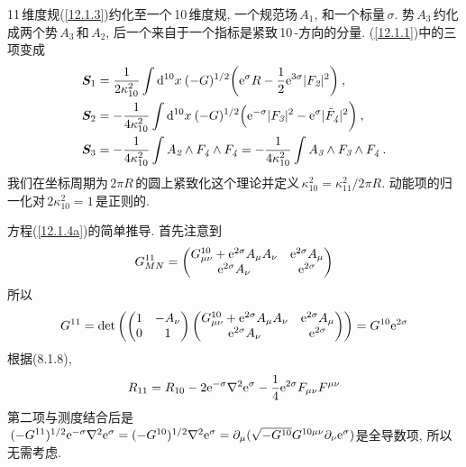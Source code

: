 11\,维度规(\ref{12.1.3})约化至一个\,10\,维度规, 一个规范场$\,A_{\textit{1}}$, 和一个标量$\,\sigma$. 势$\,A_{\textit{3}}\,$约化成两个势$\,A_{\textit{3}}\,$和$\,A_{\textit{2}}$, 后一个来自于一个指标是紧致\,10\,-方向的分量. (\ref{12.1.1})中的三项变成
\begin{subequations}
    \begin{align}
        \bm{S}_{1} &=\frac{1}{2\kappa_{10}^{2}}\int \mathrm{d}^{10}x\:(-G)^{1/2}\biggl(\mathrm{e}^{\sigma}R-\frac{1}{2}\mathrm{e}^{3\sigma}\lvert F_{\textit{2}}\rvert^{2}\biggr) \:, \label{12.1.4a} \\
        \bm{S}_{2} &=-\frac{1}{4\kappa_{10}^{2}}\int \mathrm{d}^{10}x\:(-G)^{1/2}\Bigl(\mathrm{e}^{-\sigma}\lvert F_{\textit{3}}\rvert^{2}-\mathrm{e}^{\sigma}\lvert \tilde{F}_{\textit{4}}\rvert^{2}\biggr) \:, \label{12.1.4b} \\
         \bm{S}_{3} &= - \frac{1}{4\kappa_{10}^{2}}\int A_{\textit{2}}\wedge  F_{\textit{4}} \wedge F_{\textit{4}}
         = - \frac{1}{4\kappa_{10}^{2}}\int A_{\textit{3}}\wedge  F_{\textit{3}} \wedge F_{\textit{4}} \:. \label{12.1.4c}
     \end{align}  \label{12.1.4}
\end{subequations}
我们在坐标周期为$\,2\pi R\,$的圆上紧致化这个理论并定义$\,\kappa_{10}^{2}=\kappa_{11}^{2}/2\pi R$. 动能项的归一化对$\,2\kappa_{10}^{2}=1\,$是正则的.

\begin{tcolorbox}
方程(\ref{12.1.4a})的简单推导. 首先注意到
\[
 G_{MN}^{11}=\begin{pmatrix}
     G_{\mu\nu}^{10}+\mathrm{e}^{2\sigma} A_{\mu}A_{\nu} & \mathrm{e}^{2\sigma}A_{\mu} \\
     \mathrm{e}^{2\sigma} A_{\nu} &\mathrm{e}^{2\sigma}
 \end{pmatrix}    
 \]
 所以
 \[
    G^{11}=\operatorname{det} \left(\begin{pmatrix}
        1 & -A_{\nu} \\
        0 & 1
    \end{pmatrix}    \begin{pmatrix}
        G_{\mu\nu}^{10}+\mathrm{e}^{2\sigma} A_{\mu}A_{\nu} & \mathrm{e}^{2\sigma}A_{\mu} \\
        \mathrm{e}^{2\sigma} A_{\nu} &\mathrm{e}^{2\sigma}
    \end{pmatrix}    \right)   = G^{10} \mathrm{e}^{2\sigma}
\]
根据(\textcolor{foo}{8.1.8}),
\[
            R_{11}=R_{10}-2\mathrm{e}^{-\sigma} \nabla^{2} \mathrm{e}^{\sigma} -\frac{1}{4}\mathrm{e}^{2\sigma}F_{\mu\nu}F^{\mu\nu}  
\]
第二项与测度结合后是$\,(-G^{11})^{1/2}\mathrm{e}^{-\sigma} \nabla^{2} \mathrm{e}^{\sigma}=(-G^{10})^{1/2}\nabla^{2}\mathrm{e}^{\sigma}=\partial_{\mu}(\sqrt{-G^{10}}G^{10\mu\nu}\partial_{\nu}\mathrm{e}^{\sigma})$是全导数项, 所以无需考虑.
\end{tcolorbox}
   
